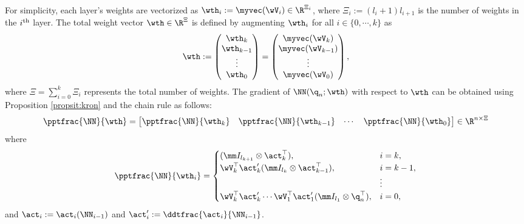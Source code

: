 \documentclass[lettersize,journal]{IEEEtran}
\begin{document}
For simplicity, each layer's weights are vectorized as $\wth_i:=\myvec(\wV_i)\in\R^{\Xi_i}$, where $\Xi_i:= (l_i+1)l_{i+1}$ is the number of weights in the $i\textsuperscript{th}$ layer. 
The total weight vector $\wth\in\R^{\Xi}$ is defined by augmenting $\wth_i$ for all $i\in \{0,\cdots,k\}$ as 
\begin{equation}
    \wth := 
    \begin{pmatrix}
        \wth_k\\
        \wth_{k-1}\\
        \vdots\\
        \wth_0
    \end{pmatrix}
    =
    \begin{pmatrix}
        \myvec(\wV_k)\\
        \myvec(\wV_{k-1})\\
        \vdots\\
        \myvec(\wV_0)
    \end{pmatrix},
\end{equation}
where $\Xi={\sum_{i=0}^{k} \Xi_i}$ represents the total number of weights. 
The gradient of $ \NN({\q}_n;\wth)$ with respect to $\wth$ can be obtained using Proposition \ref{propsit:kron} and the chain rule as follows:
\begin{equation}
    \pptfrac{\NN}{\wth}=
    \begin{bmatrix}
        \pptfrac{\NN}{\wth_k}&
        \pptfrac{\NN}{\wth_{k-1}}&
    \cdots &
        \pptfrac{\NN}{\wth_0}
    \end{bmatrix}
    \in\R^{n \times \Xi}
    \label{eq:gradient:phi}
\end{equation}
where
\begin{equation}
    \pptfrac{\NN}{\wth_i} = 
    \begin{cases}
        (
            \mm I_{l_{k+1}}
            \otimes 
            \act_{k}^\top  
        )
        , 
        &
        i=k
        ,
        \\
        \wV_k^\top\act_{k}' 
        (
            \mm I_{l_{k}}
            \otimes  
            \act_{k-1}^\top  
        )
        , 
        & 
        i=k-1
        ,
        \\
        &
        \vdots 
        \\
        \wV_k^\top\act'_{k} 
        \cdots 
        \wV_1^\top\act_1' 
        (
            \mm I_{l_1}
            \otimes 
            {\q}_n^\top  
        )
        , 
        &
        i = 0
        ,
    \end{cases}
    \label{eq:NN:grad}
\end{equation}
and $\act_i:= \act_i(\NN_{i-1})$ and $\act_i':= \ddtfrac{\act_i}{\NN_{i-1}}$.
\end{document}
